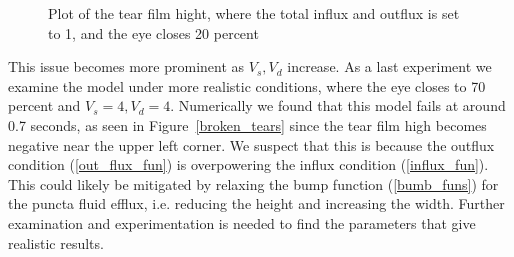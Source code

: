 \begin{figure}
	\centering
	\caption{Plot of the tear film hight, where the total influx and outflux is set to 1, and the eye closes 20 percent}
	\label{tears_02}
\end{figure}

This issue becomes more prominent as $V_s,V_d$ increase. As a last experiment we examine the model under more realistic conditions, where the eye closes to 70 percent and $V_s=4,V_d=4$. Numerically we found that this model fails at around 0.7 seconds, as seen in Figure~\ref{broken_tears} since the tear film high becomes negative near the upper left corner. We suspect that this is because the outflux condition (\ref{out_flux_fun}) is overpowering the influx condition (\ref{influx_fun}). This could likely be mitigated by relaxing the bump function (\ref{bumb_funs}) for the puncta fluid efflux, i.e. reducing the height and increasing the width. Further examination and experimentation is needed to find the parameters that give realistic results.

